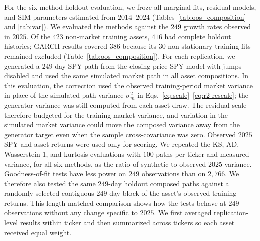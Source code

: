 For the six-method holdout evaluation, we froze all marginal fits,
residual models, and SIM parameters estimated from $2014$--$2024$
(Tables~\ref{tab:oos_composition} and \ref{tab:var}). We evaluated
the methods against the $249$ growth rates observed in $2025$. Of the
$423$ non-market training assets, $416$ had complete holdout
histories; GARCH results covered $386$ because its $30$ non-stationary training fits remained excluded
(Table~\ref{tab:oos_composition}). For each replication, we generated
a $249$-day SPY path from the closing-price SPY model with jumps
disabled and used the same simulated market path in all asset
compositions. In this evaluation, the correction used the observed
training-period market variance in place of the simulated path
variance $\sigma_m^2$ in
Eqs.~\eqref{eq:scale}--\eqref{eq:r2-rescale}; the generator variance
was still computed from each asset draw. The residual scale therefore
budgeted for the training market variance, and variation in the
simulated market variance could move the composed variance away from
the generator target even when the sample cross-covariance was zero.
Observed $2025$ SPY and asset returns were used only for scoring. We
repeated the KS, AD, Wasserstein-1, and kurtosis evaluations with
$100$ paths per ticker and measured variance, for all six methods, as the ratio of synthetic
to observed $2025$ variance. Goodness-of-fit tests have less power on
$249$ observations than on $2{,}766$. We therefore also tested the same $249$-day holdout composed paths
against a randomly selected contiguous $249$-day block of the asset's
observed training returns. This length-matched comparison shows how
the tests behave at $249$ observations without any change specific to
$2025$. We first averaged replication-level
results within ticker and then summarized across tickers so each
asset received equal weight.

